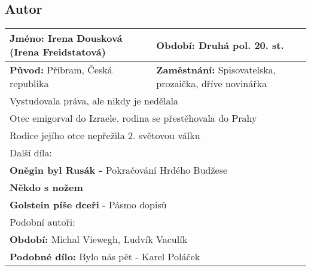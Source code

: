 \subsection*{Autor}
\begin{tabularx}{\linewidth}{l|l}
  \textbf{Jméno:} Irena Dousková (Irena Freidstatová) & \textbf{Období:} Druhá pol. 20. st.                            \\
  \hline
  \textbf{Původ:} Příbram, Česká republika            & \textbf{Zaměstnání:} Spisovatelska, prozaička, dříve novinářka \\
  \hline
  \multicolumn{2}{l}{Vystudovala práva, ale nikdy je nedělala}                                                         \\
  \multicolumn{2}{l}{Otec emigorval do Izraele, rodina se přestěhovala do Prahy}                                       \\
  \multicolumn{2}{l}{Rodice jejího otce nepřežila 2. světovou válku}                                                   \\
  \hline
  \multicolumn{2}{l}{Další díla:}                                                                                      \\
  \multicolumn{2}{l}{\textbf{Oněgin byl Rusák -} Pokračování Hrdého Budžese}                                           \\
  \multicolumn{2}{l}{\textbf{Někdo s nožem}}                                                                           \\
  \multicolumn{2}{l}{\textbf{Golstein píše dceři} - Pásmo dopisů}                                                      \\
  \hline
  \multicolumn{2}{l}{Podobní autoři:}                                                                                  \\
  \multicolumn{2}{l}{\textbf{Období:} Michal Viewegh, Ludvík Vaculík}                                                  \\
  \multicolumn{2}{l}{\textbf{Podobné dílo:} Bylo nás pět - Karel Poláček}                                              \\
\end{tabularx}
